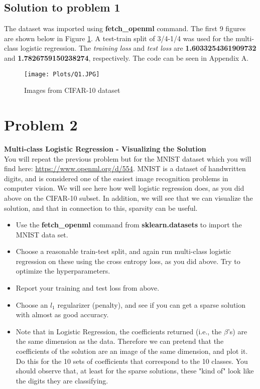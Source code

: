 \documentclass[12pt]{article}%
\begin{document}
\subsection{Solution to problem 1}
The dataset was imported using \textbf{fetch\_openml} command. The first 9 figures are shown below in Figure \ref{fig:Q1}. A test-train split of 3/4-1/4 was used for the multi-class logistic regression. The \emph{training loss} and \emph{test loss} are \textbf{1.6033254361909732} and \textbf{1.7826759150238274}, respectively. The code can be seen in Appendix A.\\

\begin{figure}[h]
\texttt{[image: Plots/Q1.JPG]}
\centering
\caption{Images from CIFAR-10 dataset}
\label{fig:Q1}
\centering
\end{figure}



\section{Problem 2}

\textbf{Multi-class Logistic Regression - Visualizing the Solution}\\

You will repeat the previous problem but for the MNIST dataset which you will find here: \url{https://www.openml.org/d/554}. MNIST is a dataset of handwritten digits, and is considered one of the easiest image recognition problems in computer vision. We will see here how well logistic regression does, as you did above on the CIFAR-10 subset. In addition, we will see that we can visualize the solution, and that in connection to this, sparsity can be useful.

\begin{itemize}
    \item Use the \textbf{fetch\_openml} command from \textbf{sklearn.datasets} to import the MNIST data set.
    \item Choose a reasonable train-test split, and again run multi-class logistic regression on these using the cross entropy loss, as you did above. Try to optimize the hyperparameters.
    \item Report your training and test loss from above.
    \item Choose an $l_1$ regularizer (penalty), and see if you can get a sparse solution with almost as good accuracy.
    \item Note that in Logistic Regression, the coefficients returned (i.e., the $\beta$'s) are the same dimension as the data. Therefore we can pretend that the coefficients of the solution are an image of the same dimension, and plot it. Do this for the 10 sets of coefficients that correspond to the 10 classes. You should observe that, at least for the sparse solutions, these "kind of" look like the digits they are classifying.
\end{itemize}
\end{document}
